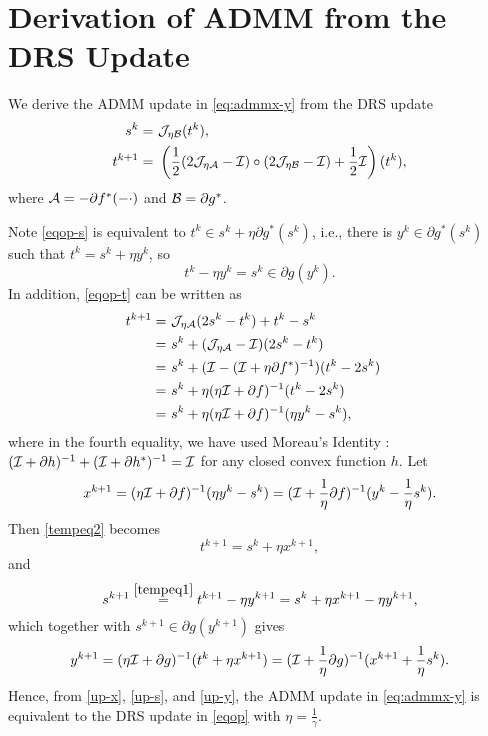 \section{Derivation of ADMM from the DRS Update}\label{sec:drs-admm}
We derive the ADMM update in \eqref{eq:admmx-y} from the DRS update \begin{subequations}\label{eqop}
\begin{align}
s^k=&\ \cJ_{\eta \cB}(t^k),\label{eqop-s}\\
t^{k+1}=&\ \left(\frac{1}{2}(2\cJ_{\eta\cA}-\cI)\circ(2\cJ_{\eta \cB}-\cI)+\frac{1}{2}\cI\right)(t^k)\label{eqop-t},
\end{align}
\end{subequations} 
where ${\mathcal{A}}=-\partial f^*(-\cdot)$ and ${\mathcal{B}}=\partial g^*$.


Note \eqref{eqop-s} is equivalent to $t^k\in s^k+\eta \partial g^*(s^k)$, i.e., there is $y^k\in \partial g^*(s^k)$ such that $t^k = s^k+\eta y^k$, so
\begin{equation}\label{tempeq1}
t^k-\eta y^k=s^k\in\partial g(y^k).
\end{equation} 
In addition, \eqref{eqop-t} can be written as
\begin{align}
t^{k+1}=&\ \cJ_{\eta\cA}(2s^k-t^k)+t^k-s^k\cr
=&\ s^k+(\cJ_{\eta\cA}-\cI)(2s^k-t^k)\cr
=&\ s^k+(\cI-(\cI+\eta\partial f^*)^{-1})(t^k-2s^k)\cr
=&\ s^k+\eta(\eta\cI+\partial f)^{-1}(t^k-2s^k)\cr
=&\ s^k+\eta(\eta\cI+\partial f)^{-1}(\eta y^k-s^k),\label{tempeq2}
\end{align} 
where in the fourth equality, we have used Moreau's Identity \cite{rockafellar1997convex}: $({\mathcal{I}}+\partial h)^{-1}+({\mathcal{I}}+\partial h^*)^{-1}={\mathcal{I}}$ for any closed convex function $h$. Let
\begin{equation}\label{up-x}
x^{k+1}=(\eta\cI+\partial f)^{-1}(\eta y^k-s^k)=(\cI+\frac{1}{\eta}\partial f)^{-1}(y^k-\frac{1}{\eta}s^k).
\end{equation}
Then \eqref{tempeq2} becomes
\begin{equation*}
t^{k+1}=s^k+\eta x^{k+1},
\end{equation*}
and 
\begin{equation}\label{up-s}
s^{k+1}\overset{\eqref{tempeq1}}=t^{k+1}-\eta y^{k+1}=s^k+\eta x^{k+1}-\eta y^{k+1},
\end{equation}
which together with $s^{k+1}\in\partial g(y^{k+1})$ gives
\begin{equation}\label{up-y}
y^{k+1}=(\eta\cI+\partial g)^{-1}(t^k+\eta x^{k+1})=(\cI+\frac{1}{\eta}\partial g)^{-1}(x^{k+1}+\frac{1}{\eta}s^k).
\end{equation}
Hence, from \eqref{up-x}, \eqref{up-s}, and \eqref{up-y}, the ADMM update in \eqref{eq:admmx-y} is equivalent to the DRS update in \eqref{eqop} with $\eta=\frac{1}{\gamma}$.
